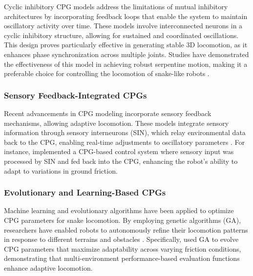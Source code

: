 \documentclass[12pt,a4paper]{report}
\begin{document}
Cyclic inhibitory CPG models address the limitations of mutual inhibitory architectures by incorporating feedback loops that enable the system to maintain oscillatory activity over time. These models involve interconnected neurons in a cyclic inhibitory structure, allowing for sustained and coordinated oscillations. This design proves particularly effective in generating stable 3D locomotion, as it enhances phase synchronization across multiple joints. Studies have demonstrated the effectiveness of this model in achieving robust serpentine motion, making it a preferable choice for controlling the locomotion of snake-like robots \textcite{Lu2006}.

\subsubsection{Sensory Feedback-Integrated CPGs}
Recent advancements in CPG modeling incorporate sensory feedback mechanisms, allowing adaptive locomotion. These models integrate sensory information through sensory interneurons (SIN), which relay environmental data back to the CPG, enabling real-time adjustments to oscillatory parameters \textcite{Inoue2007}. For instance, \textcite{Inoue2007} implemented a CPG-based control system where sensory input was processed by SIN and fed back into the CPG, enhancing the robot's ability to adapt to variations in ground friction.

\subsubsection{Evolutionary and Learning-Based CPGs}
Machine learning and evolutionary algorithms have been applied to optimize CPG parameters for snake locomotion. By employing genetic algorithms (GA), researchers have enabled robots to autonomously refine their locomotion patterns in response to different terrains and obstacles \textcite{Inoue2007}. Specifically, \textcite{Inoue2007} used GA to evolve CPG parameters that maximize adaptability across varying friction conditions, demonstrating that multi-environment performance-based evaluation functions enhance adaptive locomotion.
\end{document}
